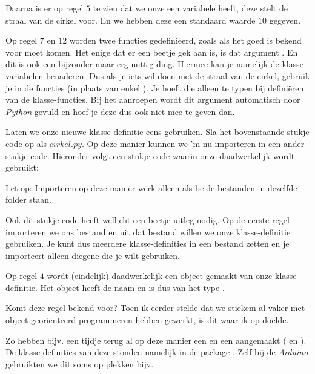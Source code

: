Daarna is er op regel $5$ te zien dat we onze  een variabele  heeft, deze stelt de straal van de cirkel voor. En we hebben deze een standaard waarde $10$ gegeven. 

Op regel $7$ en $12$ worden twee functies gedefinieerd, zoals als het goed is bekend voor moet komen. Het enige dat er een beetje gek aan is, is dat argument . En dit is ook een bijzonder maar erg nuttig ding. Hiermee kan je namelijk de klasse-variabelen benaderen. Dus als je iets wil doen met de straal van de cirkel, gebruik je in de functies  (in plaats van enkel ). Je hoeft die  alleen te typen bij definiëren van de klasse-functies. Bij het aanroepen wordt dit argument automatisch door \textit{Python} gevuld en hoef je deze dus ook niet mee te geven dan. 

Laten we onze nieuwe klasse-definitie eens gebruiken. Sla het bovenstaande stukje code op als $cirkel.py$. Op deze manier kunnen we 'm nu importeren in een ander stukje code. Hieronder volgt een stukje code waarin onze  daadwerkelijk wordt gebruikt:


\begin{remark}
Let op: Importeren op deze manier werk alleen als beide bestanden in dezelfde folder staan.
\end{remark}

Ook dit stukje code heeft wellicht een beetje uitleg nodig. Op de eerste regel importeren we ons bestand  en uit dat bestand willen we onze klasse-definitie  gebruiken. Je kunt dus meerdere klasse-definities in een bestand zetten en je importeert alleen diegene die je wilt gebruiken.  

Op regel $4$ wordt (eindelijk) daadwerkelijk een object gemaakt van onze klasse-definitie. Het object heeft de naam  en is dus van het type . 

\begin{remark} 
Komt deze regel bekend voor? Toen ik eerder stelde dat we stiekem al vaker met object georiënteerd programmeren hebben gewerkt, is dit waar ik op doelde. 

Zo hebben bijv. een tijdje terug al op deze manier een  en een  aangemaakt ( en ). De klasse-definities van deze stonden namelijk in de package . Zelf bij de \textit{Arduino} gebruikten we dit soms op plekken bijv. 
\end{remark}

